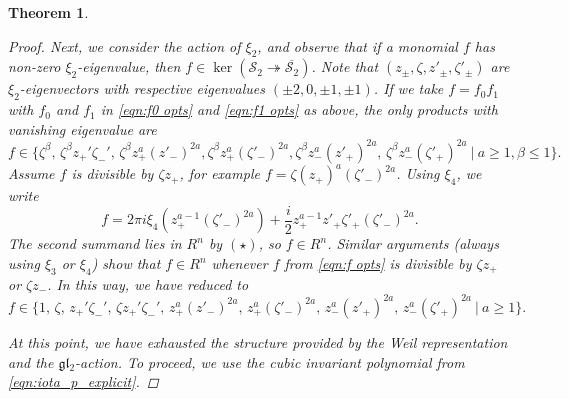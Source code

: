 \documentclass[reqno, 11pt]{amsart} %
\numberwithin{equation}{section}
\theoremstyle{plain}
\newtheorem{theorem}{Theorem}[section]
\theoremstyle{definition}
\theoremstyle{remark}
\newcommand{\ov}{\overline}
\newcommand{\mcS}{\mathcal{S}}
\newcommand{\mfg}{\mathfrak{g}}
\newcommand{\mfl}{\mathfrak{l}}
\newcommand{\mfgl}{\mfg\mfl}
\begin{document}
\begin{theorem}
\begin{proof}
Next, we consider the action of $\xi_2$, and observe that if a monomial $f$ has non-zero $ξ_2$-eigenvalue, then $f \in \ker(\mcS_2 \twoheadrightarrow \ov{\mcS_2})$. Note that $(z_{\pm}, ζ, z'_{\pm}, ζ'_{\pm})$ are $ξ_2$-eigenvectors with respective eigenvalues $(\pm 2, 0, \pm 1, \pm 1)$. If we take $f=f_0f_1$ with $f_0$ and $f_1$ in \eqref{eqn:f0 opts} and \eqref{eqn:f1 opts} as above, the only products with vanishing eigenvalue are
\begin{equation} \label{eqn:f opts}
f \in  \{ \zeta^{\beta},  \, \zeta^{\beta} z_+'\zeta_-',  \, \zeta^{\beta}z_+^a(z'_-)^{2a},\zeta^{\beta}z_+^a(\zeta'_-)^{2a}, \zeta^{\beta} z_-^a(z'_+)^{2a},\, \zeta^{\beta} z_-^a(\zeta'_+)^{2a} \ | \ a \geq 1, \beta \leq 1 \}.
\end{equation}
Assume $f$ is divisible by $ζz_+$, for example $f = ζ(z_+)^a(ζ'_-)^{2a}$. Using $\xi_4$, we write
$$f = {2 \pi i} \xi_4( z_+^{a-1} (\zeta'_-)^{2a}) + \frac{i}2 z_+^{a-1} z'_+ \zeta'_+ (\zeta'_-)^{2a}.$$
The second summand lies in $R^n$ by $(\star)$, so $f\in R^n$. Similar arguments (always using $ξ_3$ or $ξ_4$) show that $f\in R^n$ whenever $f$ from \eqref{eqn:f opts} is divisible by $ζz_+$ or $ζz_-$. In this way, we have reduced to
\begin{equation} \label{eqn:f opts better}
f \in  \{1,\, \zeta,\, z_+'\zeta_-',\, ζ z_+'\zeta_-',\, z_+^a(z'_-)^{2a},\, z_+^a(\zeta'_-)^{2a},\, z_-^a(z'_+)^{2a},\, z_-^a(\zeta'_+)^{2a} \ | \ a \geq 1\}.
\end{equation}

At this point, we have exhausted the structure provided by the Weil representation and the $\mfgl_2$-action. To proceed, we use the cubic invariant polynomial from \eqref{eqn:iota_p_explicit}.


\end{proof}
\end{theorem}
\end{document}
